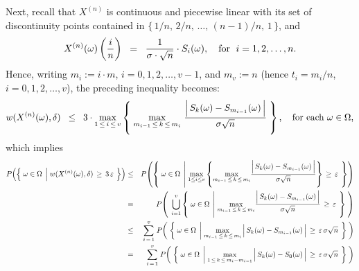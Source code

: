 Next, recall that $X^{(n)}$ is continuous and piecewise linear with its set of discontinuity points
contained in $\{\,1/n,\, 2/n,\, \ldots,\, (n-1)/n,\, 1\,\}$, and
\begin{equation*}
X^{(n)}(\omega)\left(\dfrac{i}{n}\right)
\;\;=\;\; \dfrac{1}{\sigma\cdot\sqrt{n}}\cdot S_{i}(\omega),
\quad
\textnormal{for \;$i = 1,2,\ldots, n$}.
\end{equation*}
Hence, writing $m_{i} := i\cdot m$, $i = 0, 1, 2, \ldots, v - 1$, and $m_{v} := n$ (hence $t_{i} = m_{i}/n$, $i = 0, 1, 2, \ldots, v$),
the preceding inequality becomes:
\begin{equation*}
	w(X^{(n)}(\omega),\delta) \;\; \leq \;\; 3 \cdot
	\max_{1\,\leq\,i\,\leq\,v}\left\{\;
	\max_{m_{i-1}\,\leq\,k\,\leq\,m_{i}}\,
	\dfrac{\left\vert\,S_{k}(\omega) \overset{{\color{white}.}}{-} S_{m_{i-1}}(\omega)\,\right\vert}{\sigma\sqrt{n}}
	\;\right\},
	\quad
	\textnormal{for each $\omega \in \Omega$},
\end{equation*}
which implies
\begin{eqnarray*}
P\!\left(\left\{\;
	\omega\in\Omega
	\;\left\vert\;
		\overset{{\color{white}1}}{w}(X^{(n)}(\omega),\delta)\,\geq\,3\,\varepsilon
	\right.
\;\right\}\right)
&\leq&
	P\!\left(\left\{\; \omega\in\Omega \;\left\vert\;
		\underset{1\leq i \leq v}{\max}\left\{
		\underset{m_{i-1}\,\leq\,k\,\leq\,m_{i}}{\max}
			\dfrac{\left\vert\, S_{k}(\omega) \overset{{\color{white}.}}{-} S_{m_{i-1}}(\omega) \,\right\vert}{\sigma\sqrt{n}}
		\right\}
		\,\geq\,\varepsilon
		\right.\;\right\}\right)
\\
&=&
	P\!\left(\;\,\overset{v}{\underset{i=1}{\bigcup}}\left\{\; \omega\in\Omega \;\left\vert\;
		\underset{m_{i-1}\,\leq\,k\,\leq\,m_{i}}{\max}
			\dfrac{\left\vert\, S_{k}(\omega) \overset{{\color{white}.}}{-} S_{m_{i-1}}(\omega) \,\right\vert}{\sigma\sqrt{n}}
		\,\geq\,\varepsilon
		\right.\;\right\}
		\;\right)
\\
&\leq& \overset{v}{\underset{i\,=\,1}{\sum}}\;
	P\!\left(\;\left\{\; \omega\in\Omega \;\left\vert\;
		\underset{m_{i-1}\,\leq\,k\,\leq\,m_{i}}{\max}
			\left\vert\, S_{k}(\omega) \overset{{\color{white}.}}{-} S_{m_{i-1}}(\omega) \,\right\vert
		\,\geq\,\varepsilon\,\sigma\sqrt{n}
		\right.\;\right\}
		\;\right)
\\
&=& \overset{v}{\underset{i\,=\,1}{\sum}}\;
	P\!\left(\;\left\{\; \omega\in\Omega \;\left\vert\;
		\underset{1\,\leq\,k\,\leq\,m_{i}-m_{i-1}}{\max}
			\left\vert\, S_{k}(\omega) \overset{{\color{white}.}}{-} S_{0}(\omega) \,\right\vert
		\,\geq\,\varepsilon\,\sigma\sqrt{n}
		\right.\;\right\}
		\;\right)
\end{eqnarray*}
